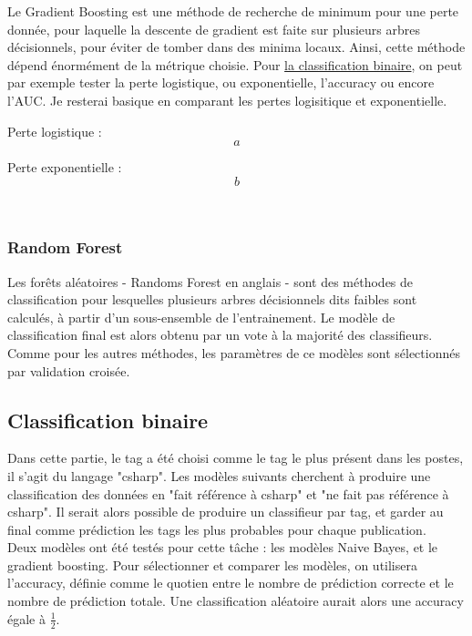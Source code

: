 \documentclass[a4paper,11pt]{article}
\begin{document}
Le Gradient Boosting est une méthode de recherche de minimum pour une perte donnée, pour laquelle la descente de gradient est faite sur plusieurs arbres décisionnels, pour éviter de tomber dans des minima locaux. Ainsi, cette méthode dépend énormément de la métrique choisie. Pour {\color{blue} \href{https://machinelearningmastery.com/metrics-evaluate-machine-learning-algorithms-python/}{la classification binaire}}, on peut par exemple tester la perte logistique, ou exponentielle, l'accuracy ou encore l'AUC. Je resterai basique en comparant les pertes logisitique et exponentielle. \\

\begin{minipage}{0.45\linewidth}
    Perte logistique : 
    $$ a $$
\end{minipage}
\hiff
\vline
\hfill
\begin{minipage}{0.45\linewidth}
    Perte exponentielle : 
    $$ b $$
\end{minipage}\\


\subsubsection*{Random Forest}
Les forêts aléatoires - Randoms Forest en anglais - sont des méthodes de classification pour lesquelles plusieurs arbres décisionnels dits faibles sont calculés, à partir d'un sous-ensemble de l'entrainement. Le modèle de classification final est alors obtenu par un vote à la majorité des classifieurs. 
Comme pour les autres méthodes, les paramètres de ce modèles sont sélectionnés par validation croisée. 

\subsection{Classification binaire}
Dans cette partie, le tag a été choisi comme le tag le plus présent dans les postes, il s'agit du langage "csharp". Les modèles suivants cherchent à produire une classification des données en "fait référence à csharp" et "ne fait pas référence à csharp". Il serait alors possible de produire un classifieur par tag, et garder au final comme prédiction les tags les plus probables pour chaque publication.\\ 

Deux modèles ont été testés pour cette tâche : les modèles Naive Bayes, et le gradient boosting. Pour sélectionner et comparer les modèles, on utilisera l'accuracy, définie comme le quotien entre le nombre de prédiction correcte et le nombre de prédiction totale. Une classification aléatoire aurait alors une accuracy égale à $\frac{1}{2}$.
\end{document}
